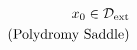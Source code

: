 \documentclass[preview]{standalone}
\begin{document}
\begin{align*}
\special{dvisvgm:raw <g id='unique000'>}x_0\in\mathcal{D}_{\text{ext}}\\\text{(Polydromy Saddle)}\special{dvisvgm:raw </g>}
\end{align*}
\end{document}
